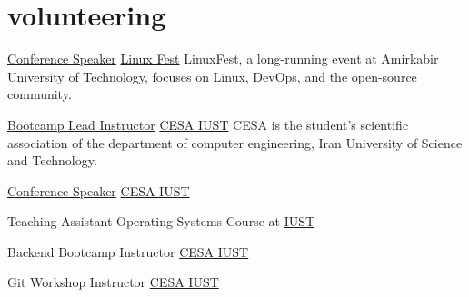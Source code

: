 \documentclass[a4paper]{article}
\begin{document}
\begin{minipage}[t]{0.3\textwidth}
  \section{volunteering}
  {

     \volunteer
     {\href{https://www.linkedin.com/posts/hadi-abbasi-dev_linuxfest2025-kubernetes-cloudnative-activity-7314945381350436864-MDSV?utm_source=share&utm_medium=member_desktop&rcm=ACoAACBgw1ABKvTqrlXwvAbFBul6vPHXEMeIFWw}{Conference Speaker}}
      {\href{https://linux-fest.ir/}{Linux Fest}}
      {LinuxFest, a long-running event at Amirkabir University of Technology, focuses on Linux, DevOps, and the open-source community.}
    
      \vspace*{6pt}

     \volunteer
     {\href{https://www.linkedin.com/posts/cesa-iust_قراره-با-هم-دنیای-وب-رو-زیر-و-رو-کنیم-activity-7221917118215180288-SRca/?rcm=ACoAACBgw1ABKvTqrlXwvAbFBul6vPHXEMeIFWw}{Bootcamp Lead Instructor}}
      {\href{https://www.linkedin.com/company/cesa-iust/}{CESA IUST}}
      {CESA is the student's scientific association of the department of computer engineering, Iran University of Science and Technology.}
    
      \vspace*{6pt}

     \volunteer
      {\href{https://www.linkedin.com/posts/sina-shabaniku_techroad-activity-7201269217688436736-C0G2?utm_source=share&utm_medium=member_desktop&rcm=ACoAACBgw1ABKvTqrlXwvAbFBul6vPHXEMeIFWw}{Conference Speaker}}
      {\href{https://www.linkedin.com/company/cesa-iust/}{CESA IUST}}
      {}

    \vspace*{4pt}

    \volunteer
      {Teaching Assistant}
      {Operating Systems Course at \href{https://www.linkedin.com/school/iran-university-of-science-and-technology/}{IUST}}
      {}

    \vspace*{4pt}

    \volunteer
      {Backend Bootcamp Instructor}
      {\href{https://www.linkedin.com/company/cesa-iust/}{CESA IUST}}
      {}

    \vspace*{4pt}

    \volunteer
      {Git Workshop Instructor}
      {\href{https://www.linkedin.com/company/cesa-iust/}{CESA IUST}}
      {}
  }
\end{minipage}
\end{document}
